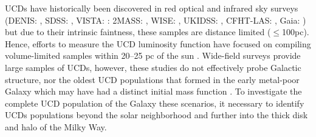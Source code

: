 \documentclass[manuscript]{aastex63}
\begin{document}
UCDs have historically been discovered in red optical and infrared sky surveys (DENIS: \citealt{refId0}, SDSS: \citealt{2010AJ....139.1808S, 2014PASP..126..642S,2017AJ....153...92T}, VISTA: \citealt{2012A&A...548A..53L,2014MNRAS.444.1793D}: 2MASS: \citealt{2007AJ....133..439C, 2010ApJS..190..100K}, WISE: \citealt{2011ApJS..197...19K, 2011ApJ...743...50C}, UKIDSS: \citealt{Marocco01062015, 2013MNRAS.430.1171D,2013MNRAS.433..457B,2016A&A...589A..49S}, CFHT-LAS: \citealt{Reyle2010a}, Gaia: \citealt{Reyle2018,2019AJ....157..231K}) but due to their intrinsic faintness, these samples are distance limited ($\leq$100pc). Hence, efforts to measure the UCD luminosity function have focused on compiling volume-limited samples within 20--25 pc of the sun \citep{2007AJ....133..439C, 2008ApJ...676.1281M, Reyle2010a,  2019ApJS..240...19K,2019arXiv190604166B}. Wide-field surveys provide large samples of UCDs, however, these studies do not effectively probe Galactic structure, nor the oldest UCD populations that formed in the early metal-poor Galaxy which may have had a distinct initial mass function \citep{2002MNRAS.332L..65B,2003Natur.425..812B,2003ASPC..287..427B}. To investigate the complete UCD population of the Galaxy these scenarios, it necessary to identify UCDs populations beyond the solar neighborhood and further into the thick disk and halo of the Milky Way.
\end{document}
